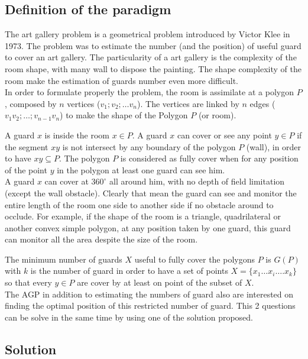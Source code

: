 	\subsection{Definition of the paradigm}
	The art gallery problem is a geometrical problem introduced by Victor Klee in 1973. The problem was to estimate the number (and the position) of useful guard to cover an art gallery. 
The particularity of a art gallery is the complexity of the room shape, with many wall to dispose the painting. The shape complexity of the room make the estimation  of guards number even more difficult.\\
In order to formulate properly the problem, the room is assimilate at a polygon $P$, composed by $n$ vertices ($v_1; v_2;…v_n$). The vertices are linked by  $n$ edges ($v_1 v_2;…; v_{n-1} v_n$) to make  the shape of the Polygon $P$ (or room).

A guard $x$ is inside the room $x \in P$. A guard $x$ can cover or see any point $y \in P$ if the segment $xy$ is not intersect by any boundary of the polygon $P$ (wall), in order to have $ xy \subseteq P$.
The polygon $P$ is considered as fully cover when for any position of the point $y$ in the polygon at least one guard can see him.\\
A guard $x$ can cover at $360^\circ$ all around him, with no depth of field limitation (except the wall obstacle). Clearly that mean the guard can see and monitor the entire length of the room one side to another side if no obstacle around to occlude. For example, if the shape of the room is a triangle, quadrilateral or another convex simple polygon, at any position taken by one guard, this guard can monitor all the area despite the size of the room. 

The minimum number of guards $X$ useful to fully cover the polygons $P$ is $G(P)$ with $k$ is the number of guard in order to have a set of points $X=\{x_1…x_i…. x_k\}$ so that every $y\in P$  are cover by at least on point of the subset of $X$. \\
The AGP  in addition  to estimating the numbers of guard also are interested on finding the optimal position of this  restricted number of guard. 
This 2 questions can be solve in the same time by using one of the solution proposed.


	\subsection{Solution }
	
